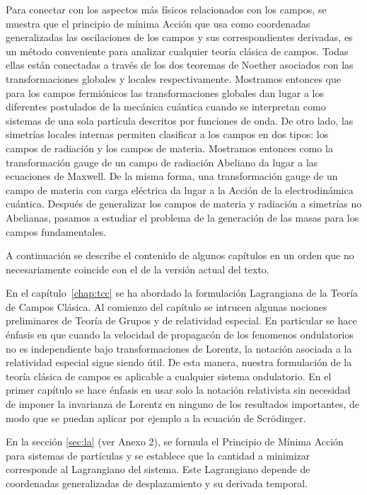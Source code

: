 Para conectar con los aspectos más físicos relacionados con los campos, se muestra que el principio de mínima Acción que usa como coordenadas generalizadas las oscilaciones de los campos y sus correspondientes derivadas, es un método conveniente para analizar cualquier teoría clásica de campos. Todas ellas están conectadas a través de los dos teoremas de Noether asociados con las transformaciones globales y locales respectivamente.  Mostramos entonces que para los campos fermiónicos las transformaciones globales dan lugar a los diferentes postulados de la mecánica cuántica cuando se interpretan como sistemas de una sola partícula descritos por funciones de onda. 
De otro lado, las simetrías locales internas permiten clasificar a los campos en dos tipos: los campos de radiación y los campos de materia. Mostramos entonces como la transformación gauge de un campo de radiación Abeliano da lugar a las ecuaciones de Maxwell.  De la misma forma, una transformación gauge de un campo de materia con carga eléctrica da lugar a la Acción de la electrodinámica cuántica. Después de generalizar los campos de materia y radiación a simetrías no Abelianas, pasamos a estudiar el problema de la generación de las masas para los campos fundamentales. 

A continuación se describe el contenido de algunos capítulos en un orden que no necesariamente coincide con el de la versión actual del texto.

En el capítulo~\ref{chap:tcc} se ha abordado la formulación Lagrangiana de la Teoría de Campos Clásica.
Al comienzo del capítulo se intrucen algunas nociones preliminares de Teoría de Grupos y de relatividad especial. En particular se hace énfasis en que cuando la velocidad de propagacón de los fenomenos ondulatorios no es independiente bajo transformaciones de Lorentz, la notación asociada a la relatividad especial sigue siendo útil. De esta manera, nuestra formulación de la teoría clásica de campos es aplicable a cualquier sistema ondulatorio. En el primer capítulo se hace énfasis en usar solo la notación relativista sin necesidad de imponer la invarianza de Lorentz en ninguno de los resultados importantes, de modo que se puedan aplicar por ejemplo a la ecuación de Scrödinger. 

En la sección \ref{sec:la} (ver Anexo 2), se formula el Principio de Mínima Acción para sistemas de partículas y se establece que la cantidad a minimizar corresponde al Lagrangiano del sistema. Este Lagrangiano depende de coordenadas generalizadas de desplazamiento y su derivada temporal. 

